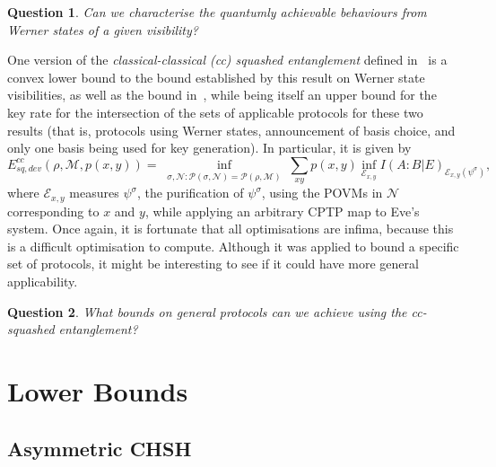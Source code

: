 \documentclass[10pt, a4paper]{article}
\numberwithin{equation}{section} %
\theoremstyle{definition}
\theoremstyle{plain}
\newtheorem{question}{Question}
\newcommand{\?}{\mathrel{?}} %
\newcommand{\sM}{\mathcal{M}}
\newcommand{\sN}{\mathcal{N}}
\newcommand{\cE}{\mathcal{E}}
\newcommand{\cP}{\mathcal{P}}
\begin{document}
      \begin{question}
        Can we characterise the quantumly achievable behaviours from Werner states of a given visibility?
      \end{question}

      One version of the \emph{classical-classical (cc) squashed entanglement} defined in~\cite{CCSquashedEntangle} is a convex lower bound to the bound established by this result on Werner state visibilities, as well as the bound in~\cite{RevisedPeres}, while being itself an upper bound for the key rate for the intersection of the sets of applicable protocols for these two results (that is, protocols using Werner states, announcement of basis choice, and only one basis being used for key generation). In particular, it is given by
      \begin{equation}
        E^{cc}_{sq,dev}(\rho, \sM, p(x,y)) = \inf_{\substack{\sigma, \sN : \cP(\sigma, \sN) = \cP(\rho, \sM)}} \sum_{xy} p(x,y) \inf_{\cE_{x,y}} I{(A : B|E)}_{\cE_{x,y}(\psi^{\sigma})},
      \end{equation}
      where \(\cE_{x,y}\) measures \(\psi^\sigma\), the purification of \(\psi^{\sigma}\), using the POVMs in \(\sN\) corresponding to \(x\) and \(y\), while applying an arbitrary CPTP map to Eve's system. Once again, it is fortunate that all optimisations are infima, because this is a difficult optimisation to compute. Although it was applied to bound a specific set of protocols, it might be interesting to see if it could have more general applicability.

      \begin{question}
        What bounds on general protocols can we achieve using the cc-squashed entanglement?
      \end{question}

      \section{Lower Bounds}\label{sec:lbound}

      \subsection{Asymmetric CHSH}
\end{document}
